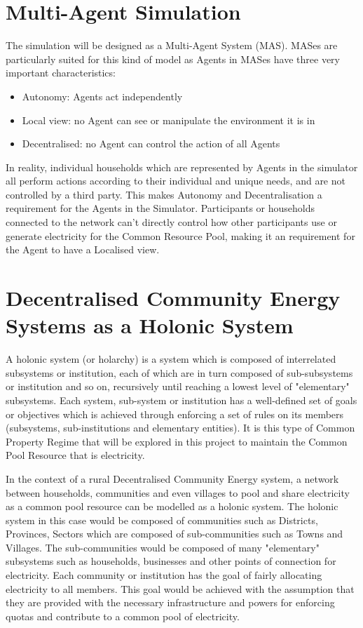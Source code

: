 \section*{Multi-Agent Simulation}
The simulation will be designed as a Multi-Agent System (MAS). MASes are particularly suited for this kind of model as Agents in MASes have three very important characteristics:
\begin{itemize}
	\item Autonomy: Agents act independently
	\item Local view: no Agent can see or manipulate the environment it is in
	\item Decentralised: no Agent can control the action of all Agents
\end{itemize}
In reality, individual households which are represented by Agents in the simulator all perform actions according to their individual and unique needs, and are not controlled by a third party. This makes Autonomy and Decentralisation a requirement for the Agents in the Simulator. Participants or households connected to the network can't directly control how other participants use or generate electricity for the Common Resource Pool, making it an requirement for the Agent to have a Localised view. 

\section*{Decentralised Community Energy Systems as a Holonic System}
A holonic system (or holarchy) is a system which is composed of interrelated subsystems or institution, each of which are in turn composed of sub-subsystems  or institution and so on, recursively until reaching a lowest level of "elementary" subsystems. Each system, sub-system or institution has a well-defined set of goals or objectives which is achieved through enforcing a set of rules on its members (subsystems, sub-institutions and elementary entities)\cite{Pitt:Holonic_Institutions}. It is this type of Common Property Regime that will be explored in this project to maintain the Common Pool Resource that is electricity. 

In the context of a rural Decentralised Community Energy system, a network between households, communities and even villages to pool and share electricity as a common pool resource can be modelled as a holonic system. The holonic system in this case would be composed of communities such as Districts, Provinces, Sectors which are composed of sub-communities such as Towns and Villages. The sub-communities would be composed of many "elementary" subsystems such as households, businesses and other points of connection for electricity. Each community or institution has the goal of fairly allocating electricity to all members. This goal would be achieved with the assumption that they are provided with the necessary infrastructure and powers for enforcing quotas and contribute to a common pool of electricity.

